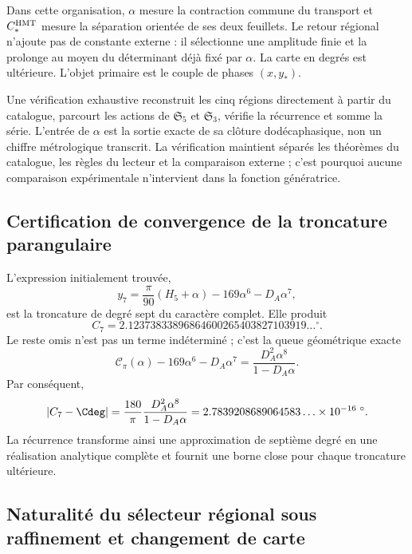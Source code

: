 Dans cette organisation, \(\alpha\) mesure la contraction commune du transport et
\(C_*^{\rm HMT}\) mesure la séparation orientée de ses deux feuillets. Le retour
régional n'ajoute pas de constante externe : il sélectionne une amplitude finie et la
prolonge au moyen du déterminant déjà fixé par \(\alpha\). La carte en
degrés est ultérieure. L'objet primaire est le couple de phases \((x,y_*)\).

Une vérification exhaustive reconstruit les cinq régions directement
à partir du catalogue, parcourt les actions de
\(\mathfrak S_5\) et \(\mathfrak S_3\), vérifie la récurrence et somme la
série. L'entrée de \(\alpha\) est la sortie exacte de sa clôture
dodécaphasique, non un chiffre métrologique transcrit. La vérification maintient
séparés les théorèmes du catalogue, les règles du lecteur et la comparaison
externe ; c'est pourquoi aucune comparaison expérimentale n'intervient dans la fonction
génératrice.
\subsection{Certification de convergence de la troncature parangulaire}
\label{sec:s102:c38:7:4}


L'expression initialement trouvée,
\[
y_7=\frac\pi{90}(H_5+\alpha)-169\alpha^6-D_A\alpha^7,
\]
est la troncature de degré sept du caractère complet. Elle produit
\[
C_7=2.12373833896864600265403827103919\ldots{}^\circ.
\]
Le reste omis n'est pas un terme indéterminé ; c'est la queue géométrique
exacte
\[
\mathscr C_\pi(\alpha)
-169\alpha^6-D_A\alpha^7
=\frac{D_A^2\alpha^8}{1-D_A\alpha}.
\]
Par conséquent,
\[
\left|C_7-\Cdeg\right|
=\frac{180}{\pi}\frac{D_A^2\alpha^8}{1-D_A\alpha}
=2.7839208689064583\ldots\times10^{-16}\;{}^\circ.
\]
La récurrence transforme ainsi une approximation de septième degré en une
réalisation analytique complète et fournit une borne close pour chaque
troncature ultérieure.

\subsection{Naturalité du sélecteur régional sous raffinement et changement de carte}
\label{sec:s102:c38:7:5}


